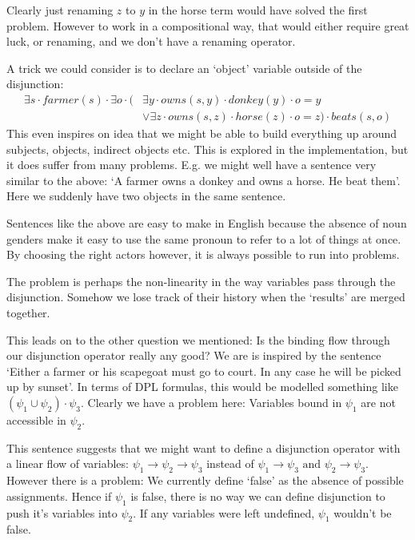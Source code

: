\documentclass[12pt]{article}
\begin{document}
Clearly just renaming $z$ to $y$ in the horse term would have solved the first problem. However to work in a compositional way, that would either require great luck, or renaming, and we don't have a renaming operator.

A trick we could consider is to declare an `object' variable outside of the disjunction:
\begin{align}
\exists s\cdot farmer(s)\cdot\exists o\cdot(
      &\exists y\cdot owns(s,y)\cdot donkey(y)\cdot o=y \nonumber\\
      &\vee \exists z\cdot owns(s,z)\cdot horse(z)\cdot o=z)\cdot beats(s,o)
\end{align}
%
This even inspires on idea that we might be able to build everything up around subjects, objects, indirect objects etc. This is explored in the implementation, but it does suffer from many problems. E.g. we might well have a sentence very similar to the above: `A farmer owns a donkey and owns a horse. He beat them'. Here we suddenly have two objects in the same sentence.

Sentences like the above are easy to make in English because the absence of noun genders make it easy to use the same pronoun to refer to a lot of things at once. By choosing the right actors however, it is always possible to run into problems.

The problem is perhaps the non-linearity in the way variables pass through the disjunction. Somehow we lose track of their history when the `results' are merged together.

This leads on to the other question we mentioned: Is the binding flow through our disjunction operator really any good? We are is inspired by the sentence `Either a farmer or his scapegoat must go to court. In any case he will be picked up by sunset'. In terms of DPL formulas, this would be modelled something like $(\psi_1\cup\psi_2)\cdot\psi_3$. Clearly we have a problem here: Variables bound in $\psi_1$ are not accessible in $\psi_2$.

This sentence suggests that we might want to define a disjunction operator with a linear flow of variables: $\psi_1\to\psi_2\to\psi_3$ instead of $\psi_1\to\psi_3\text{ and }\psi_2\to\psi_3$. However there is a problem: We currently define `false' as the absence of possible assignments. Hence if $\psi_1$ is false, there is no way we can define disjunction to push it's variables into $\psi_2$. If any variables were left undefined, $\psi_1$ wouldn't be false.
\end{document}
